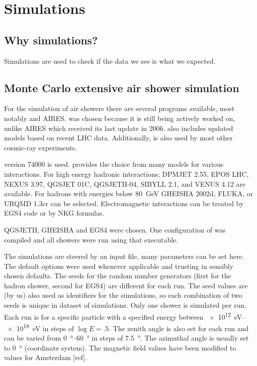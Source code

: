 \chapter{Simulations}
\label{ch:simulations}

\section{Why simulations?}

Simulations are used to check if the data we see is what we expected.



\section{Monte Carlo extensive air shower simulation}

For the simulation of air showers there are several programs available,
most notably \corsika and AIRES. \corsika was chosen because it is still
being actively worked on, unlike AIRES which received its last update in
2006. \corsika also includes updated models based on recent LHC data.
Additionally, \corsika is also used by most other cosmic-ray
experiments.

\corsika version 74000 is used. \corsika provides the choice from many
models for various interactions. For high energy hadronic interactions;
DPMJET 2.55, EPOS LHC\cite{pierog2013}, NEXUS 3.97, QGSJET 01C,
QGSJETII-04\cite{ostapchenko2013}, SIBYLL 2.1, and VENUS 4.12 are
available. For hadrons with energies below \SI{80}{\giga\electronvolt}
GHEISHA 2002d\cite{fesefeldt1985}, FLUKA, or URQMD 1.3cr can be
selected. Electromagnetic interactions can be treated by EGS4\cite{egs4}
code or by NKG formulas.

QGSJETII, GHEISHA and EGS4 were chosen. One configuration of \corsika
was compiled and all showers were run using that executable.

The simulations are steered by an input file, many parameters can be set
here. The default options were used whenever applicable and trusting in
sensibly chosen defaults. The seeds for the random number generators
(first for the hadron shower, second for EGS4) are different for each
run. The seed values are (by us) also used as identifiers for the
simulations, so each combination of two seeds is unique in dataset of
simulations. Only one shower is simulated per run. Each run is for a
specific particle with a specified energy between
\SIrange{e12}{e18}{\electronvolt} in steps of $\log E = .5$.
The zenith angle is also set for each run and can be varied from
\SIrange{0}{60}{\degree} in steps of \SI{7.5}{\degree}. The azimuthal
angle is usually set to \SI{0}{\degree} (\hisparc coordinate system). 
The magnetic field values have been modified to values for Amsterdam [ref].

